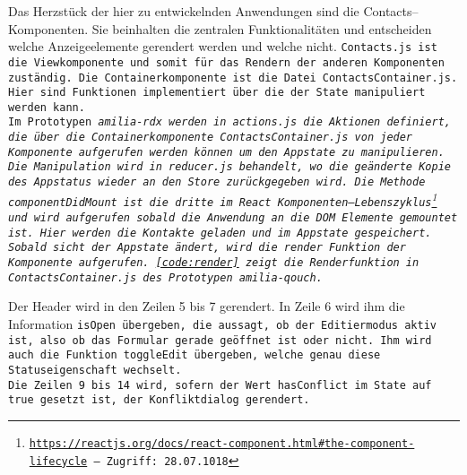 Das Herzstück der hier zu entwickelnden Anwendungen sind die Contacts--Komponenten.
Sie beinhalten die zentralen Funktionalitäten und entscheiden welche Anzeigeelemente gerendert werden und welche nicht.
\tt{Contacts.js} ist die Viewkomponente und somit für das Rendern der anderen Komponenten zuständig. 
Die Containerkomponente ist die Datei \tt{ContactsContainer.js}. 
Hier sind Funktionen implementiert über die der State manipuliert werden kann.\\
%
Im Prototypen \it{amilia-rdx} werden in \tt{actions.js} die Aktionen definiert, die über die Containerkomponente \tt{ContactsContainer.js} von jeder Komponente aufgerufen werden können um den \gls{App}state zu manipulieren.
Die Manipulation wird in \tt{reducer.js} behandelt, wo die geänderte Kopie des \gls{App}status wieder an den Store zurückgegeben wird.
%
% 
Die Methode \tt{componentDidMount} ist die dritte im React Komponenten--Lebenszyklus\footnote{ \url{https://reactjs.org/docs/react-component.html\#the-component-lifecycle} -- Zugriff: 28.07.1018} und wird aufgerufen sobald die Anwendung an die DOM Elemente gemountet ist.
Hier werden die Kontakte geladen und im \gls{App}state gespeichert.
Sobald sicht der \gls{App}state ändert, wird die \tt{render} Funktion der Komponente aufgerufen.
\autoref{code:render} zeigt die Renderfunktion in \tt{ContactsContainer.js} des Prototypen \it{amilia-qouch}.
%
\begin{center}
  
\end{center}
%
Der Header wird in den Zeilen 5 bis 7 gerendert.
In Zeile 6 wird ihm die Information \tt{isOpen} übergeben, die aussagt, ob der Editiermodus aktiv ist, also ob das Formular gerade geöffnet ist oder nicht.
Ihm wird auch die Funktion \tt{toggleEdit} übergeben, welche genau diese Statuseigenschaft wechselt.\\
%
Die Zeilen 9 bis 14 wird, sofern der Wert \tt{hasConflict} im State auf \tt{true} gesetzt ist, der Konfliktdialog gerendert.

